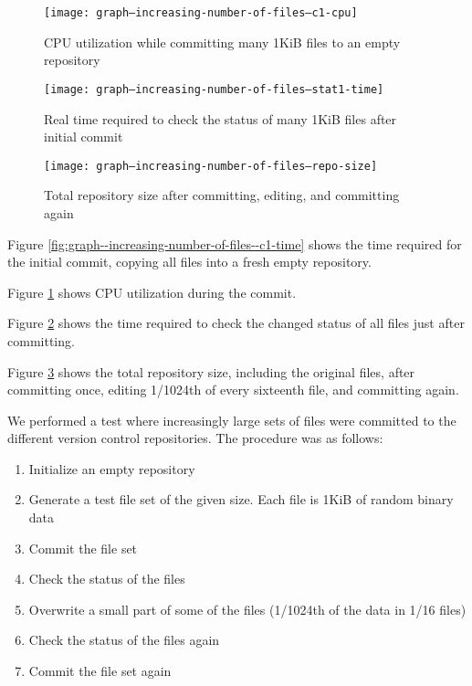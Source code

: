 \documentclass[a4paper]{article}
\begin{document}
\begin{figure}[p]
  \caption{CPU utilization while committing many 1KiB files to an empty
  repository}
  \label{fig:graph--increasing-number-of-files--c1-cpu}
  \centering
    \texttt{[image: graph--increasing-number-of-files--c1-cpu]}
\end{figure}

\begin{figure}[p]
  \caption{Real time required to check the status of many 1KiB files after
  initial commit}
  \label{fig:graph--increasing-number-of-files--stat1-time}
  \centering
    \texttt{[image: graph--increasing-number-of-files--stat1-time]}
\end{figure}

\begin{figure}[p]
  \caption{Total repository size after committing, editing, and committing again}
  \label{fig:graph--increasing-number-of-files--repo-size}
  \centering
    \texttt{[image: graph--increasing-number-of-files--repo-size]}
\end{figure}

Figure \ref{fig:graph--increasing-number-of-files--c1-time} shows the time
required for the initial commit, copying all files into a fresh empty
repository.

Figure \ref{fig:graph--increasing-number-of-files--c1-cpu} shows CPU utilization
during the commit.

Figure \ref{fig:graph--increasing-number-of-files--stat1-time} shows the time
required to check the changed status of all files just after committing.

Figure \ref{fig:graph--increasing-number-of-files--repo-size} shows the total
repository size, including the original files, after committing once, editing
1/1024th of every sixteenth file, and committing again.


\iffalse

We performed a test where increasingly large sets of files were committed to the
different version control repositories. The procedure was as follows:

\begin{enumerate}
    \setlength{\itemsep}{0pt}
    \setlength{\parskip}{0pt}
    \setlength{\parsep}{0pt}
    \item Initialize an empty repository
    \item Generate a test file set of the given size. Each file is 1KiB of
        random binary data
    \item Commit the file set
    \item Check the status of the files
    \item Overwrite a small part of some of the files (1/1024th of the data in
        1/16 files)
    \item Check the status of the files again
    \item Commit the file set again
\end{enumerate}
\end{document}
